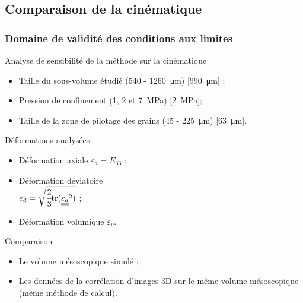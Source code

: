 \documentclass[8pt]{beamer}
\def\doubleunderline#1{\underline{\underline{#1}}}
\begin{document}
\subsection{Comparaison de la cinématique}
\begin{frame}
	\frametitle{Domaine de validité des conditions aux limites}
	\vfill
	\begin{block}{Analyse de sensibilité de la méthode sur la cinématique}
		\begin{itemize}[label=$\rightarrow$]
			\item Taille du sous-volume étudié (\num{540} - \SI{1260}{\micro\meter}) [{\color{red}\SI{990}{\micro\meter}}] ;
			\item Pression de confinement (\num{1}, \num{2} et \SI{7}{\mega\pascal}) [{\color{red}\SI{2}{\mega\pascal}}];
			\item Taille de la zone de pilotage des grains (\num{45} - \SI{225}{\micro\meter}) [{\color{red}\SI{63}{\micro\meter}}].
		\end{itemize}
	\end{block}
	\vfill
	\begin{minipage}[t]{.48\textwidth}
		\begin{block}{Déformations analysées}
			\begin{itemize}[label=$\rightarrow$]
				\item Déformation axiale $\varepsilon_a = E_{33}$ ;
				\item Déformation déviatoire\\$\varepsilon_d = \sqrt{\cfrac{2}{3}\mathrm{tr}(\doubleunderline{\varepsilon_d}^2)}$ ;
				\item Déformation volumique $\varepsilon_v$.
			\end{itemize}
		\end{block}
	\end{minipage}
	\begin{minipage}{.03\textwidth}
		\null
	\end{minipage}
	\begin{minipage}[t]{.48\textwidth}
		\begin{block}{Comparaison}
			\begin{itemize}[label=$\rightarrow$]
				\item Le volume mésoscopique simulé ;
				\item Les données de la corrélation d'images 3D sur le même volume mésoscopique (même méthode de calcul).
			\end{itemize}
		\end{block}
	\end{minipage}\\
	\vfill
\end{frame}
\end{document}
